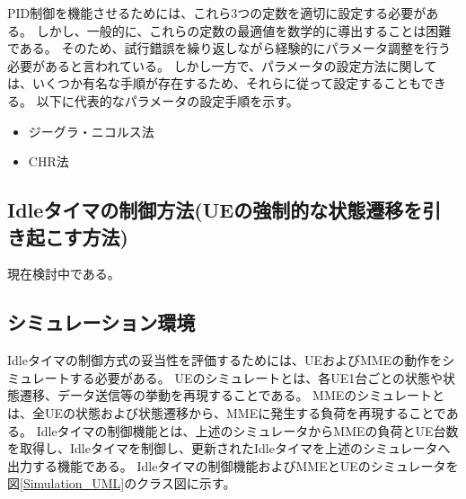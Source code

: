 \documentclass[a4j]{ujarticle}
\begin{document}
PID制御を機能させるためには、これら3つの定数を適切に設定する必要がある。
しかし、一般的に、これらの定数の最適値を数学的に導出することは困難である。
そのため、試行錯誤を繰り返しながら経験的にパラメータ調整を行う必要があると言われている。
しかし一方で、パラメータの設定方法に関しては、いくつか有名な手順が存在するため、それらに従って設定することもできる。
以下に代表的なパラメータの設定手順を示す。
\begin{itemize}
  \item ジーグラ・ニコルス法
  \item CHR法
\end{itemize}


\subsection{Idleタイマの制御方法(UEの強制的な状態遷移を引き起こす方法)}
\label{sec:soft-state}
現在検討中である。
%
%

\subsection{シミュレーション環境}
\label{sec:simulation_system}
Idleタイマの制御方式の妥当性を評価するためには、UEおよびMMEの動作をシミュレートする必要がある。
UEのシミュレートとは、各UE1台ごとの状態や状態遷移、データ送信等の挙動を再現することである。
MMEのシミュレートとは、全UEの状態および状態遷移から、MMEに発生する負荷を再現することである。
Idleタイマの制御機能とは、上述のシミュレータからMMEの負荷とUE台数を取得し、Idleタイマを制御し、更新されたIdleタイマを上述のシミュレータへ出力する機能である。
Idleタイマの制御機能およびMMEとUEのシミュレータを図\ref{Simulation_UML}のクラス図に示す。
\end{document}
